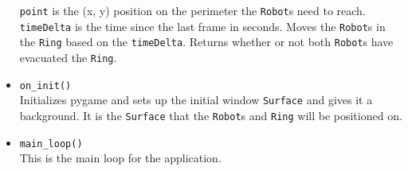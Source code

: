 \documentclass[12pt,letterpaper]{article}
\begin{document}
\begin{itemize}
                \texttt{point} is the (x, y) position on the perimeter the \texttt{Robot}s need to reach. \texttt{timeDelta} is the time since the last frame in seconds. Moves the \texttt{Robot}s in the \texttt{Ring} based on the \texttt{timeDelta}. Returns whether or not both \texttt{Robot}s have evacuated the \texttt{Ring}.
            \item \texttt{on\_init()} \\
                Initializes pygame and sets up the initial window \texttt{Surface} and gives it a background. It is the \texttt{Surface} that the \texttt{Robot}s and \texttt{Ring} will be positioned on.
            \item \texttt{main\_loop()} \\
                This is the main loop for the application.
        \end{itemize}

        
\end{document}
